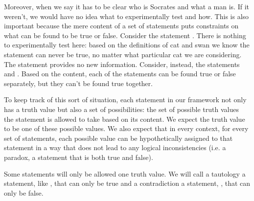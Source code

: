 \documentclass[11pt,letterpaper,fleqn]{memoir} %
\begin{document}
Moreover, when we say  it has to be clear who is Socrates and what a man is. If it weren't, we would have no idea what to experimentally test and how. This is also important because the mere content of a set of statements puts constraints on what can be found to be true or false. Consider the statement . There is nothing to experimentally test here: based on the definitions of cat and swan we know the statement can never be true, no matter what particular cat we are considering. The statement provides no new information. Consider, instead, the statements  and . Based on the content, each of the statements can be found true or false separately, but they can't be found true together.

To keep track of this sort of situation, each statement in our framework not only has a truth value but also a set of possibilities: the set of possible truth values the statement is allowed to take based on its content. We expect the truth value to be one of these possible values. We also expect that in every context, for every set of statements, each possible value can be hypothetically assigned to that statement in a way that does not lead to any logical inconsistencies (i.e. a paradox, a statement that is both true and false).

Some statements will only be allowed one truth value. We will call a tautology a statement, like , that can only be true and a contradiction a statement, , that can only be false.
\end{document}
